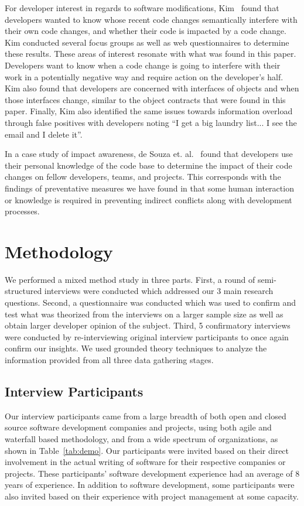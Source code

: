 \documentclass[conference]{IEEEtran}
\begin{document}
For developer interest in regards to software modifications, Kim~\cite{Kim:2011:ESA} found that developers wanted to know whose
recent code changes semantically interfere with their own code changes, and whether their code is impacted by a code change.
Kim conducted several focus groups as well as web questionnaires to determine these results. These areas of interest resonate with what was
found in this paper. Developers want to know when a code change is going to interfere with their work in a potentially negative way and
require action on the developer's half.  Kim
also found that developers are concerned with interfaces of objects and when those interfaces change, similar to the object contracts that
were found in this paper. Finally, Kim also identified the same issues towards information overload through false positives with developers
noting ``I get a big laundry list... I see the email and I delete it''.

In a case study of impact awareness, de Souza et. al.~\cite{deSouza:2008:ESS} found that developers use their personal knowledge of the
code base to determine the impact of their code changes on fellow developers, teams, and projects. This corresponds with the findings of
preventative measures we have found in that some human interaction or knowledge is required in preventing indirect conflicts along with
development processes.

\section{Methodology}
\label{sec:meth}

We performed a mixed method study in three parts. First, a round of semi-structured interviews were conducted which
addressed our 3 main research questions. Second, a questionnaire was conducted
which was used to confirm and test what was theorized from the interviews on a larger sample size as well as obtain
larger developer opinion of the subject. Third, 5 confirmatory interviews were conducted by re-interviewing original
interview participants to once again confirm our insights.
We used grounded theory techniques to analyze the information provided from all three data gathering stages.

\subsection{Interview Participants}

Our interview participants came from a large breadth of both open and closed source software development companies
and projects, using both  agile and waterfall based methodology, and from a wide spectrum of organizations, as shown in Table~\ref{tab:demo}.
Our participants were invited based on their direct involvement in the actual writing of software for
their respective companies or projects. These participants' software development experience had an average of 8 years of experience.
In addition to software development, some participants were also invited based on their experience with project management
at some capacity.
\end{document}
